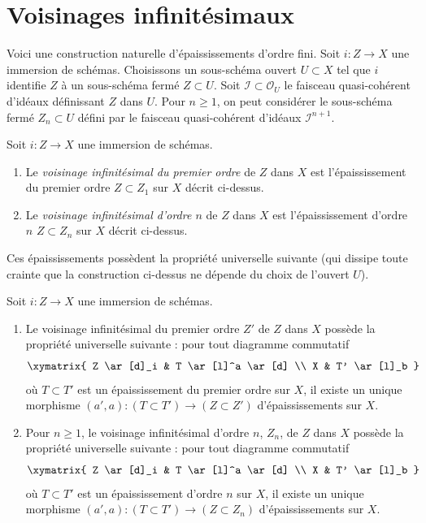 \section{Voisinages infinitésimaux}
\label{section-first-order-infinitesimal-neighbourhood}

\noindent
Voici une construction naturelle d'épaississements d'ordre fini.
Soit $i : Z \to X$ une immersion de schémas. Choisissons un
sous-schéma ouvert $U \subset X$ tel que $i$ identifie $Z$ à un sous-schéma
fermé $Z \subset U$. Soit $\mathcal{I} \subset \mathcal{O}_U$ le
faisceau quasi-cohérent d'idéaux définissant $Z$ dans $U$. Pour $n \geq 1$,
on peut considérer le sous-schéma fermé $Z_n \subset U$
défini par le faisceau quasi-cohérent d'idéaux $\mathcal{I}^{n + 1}$.

\begin{definition}
\label{definition-first-order-infinitesimal-neighbourhood}
Soit $i : Z \to X$ une immersion de schémas.
\begin{enumerate}
\item Le {\it voisinage infinitésimal du premier ordre} de $Z$ dans $X$ est
l'épaississement du premier ordre $Z \subset Z_1$ sur $X$ décrit ci-dessus.
\item Le {\it voisinage infinitésimal d'ordre $n$} de $Z$ dans $X$ est
l'épaississement d'ordre $n$ $Z \subset Z_n$ sur $X$ décrit ci-dessus.
\end{enumerate}
\end{definition}

\noindent
Ces épaississements possèdent la propriété universelle suivante (qui dissipe
toute crainte que la construction ci-dessus ne dépende du choix de l'ouvert
$U$).

\begin{lemma}
\label{lemma-first-order-infinitesimal-neighbourhood}
Soit $i : Z \to X$ une immersion de schémas.
\begin{enumerate}
\item Le voisinage infinitésimal du premier ordre $Z'$ de $Z$ dans $X$
possède la propriété universelle suivante : pour tout diagramme commutatif
$$
\xymatrix{
Z \ar[d]_i & T \ar[l]^a \ar[d] \\
X & T' \ar[l]_b
}
$$
où $T \subset T'$ est un épaississement du premier ordre sur $X$, il existe
un unique morphisme $(a', a) : (T \subset T') \to (Z \subset Z')$
d'épaississements sur $X$.
\item Pour $n \geq 1$, le voisinage infinitésimal d'ordre $n$, $Z_n$,
de $Z$ dans $X$ possède la propriété universelle suivante : pour tout diagramme
commutatif
$$
\xymatrix{
Z \ar[d]_i & T \ar[l]^a \ar[d] \\
X & T' \ar[l]_b
}
$$
où $T \subset T'$ est un épaississement d'ordre $n$ sur $X$, il existe
un unique morphisme $(a', a) : (T \subset T') \to (Z \subset Z_n)$
d'épaississements sur $X$.
\end{enumerate}
\end{lemma}

